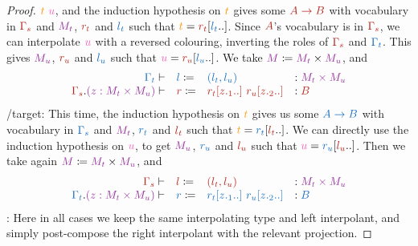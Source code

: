 \documentclass[a4paper,UKenglish,cleveref, autoref, thm-restate]{lipics-v2021}
\begin{document}
\begin{proof}
  \(\icol{t}~\ccol{u}\), and the induction hypothesis on \(\icol{t}\) gives
  some \(\scol{A \to B}\) with vocabulary in \(\scol{\Gamma_s}\) and
  \(\mcol{M_t}\), \(\scol{r_t}\) and \(\tcol{l_t}\) such that
  \(\icol{t} = \subs{\scol{r_t}}{\tcol{l_t}..}\). Since \(\scol{A}\)'s
  vocabulary is in \(\scol{\Gamma_s}\), we can
  interpolate \(\ccol{u}\) with a reversed colouring,
  \ie inverting the roles of \(\scol{\Gamma_s}\) and \(\tcol{\Gamma_t}\).
  This gives \(\mcol{M_u}\), \(\scol{r_u}\) and \(\tcol{l_u}\) such that
  \(\ccol{u} = \subs{\scol{r_u}}{\tcol{l_u}..}\). We take
  \(\mcol{M} \coloneq \mcol{M_t} \times \mcol{M_u}\), and
  \[\begin{array}{rlll}
      \tcol{\Gamma_{t}} \vdash & \tcol{l} \coloneq & \tcol{(l_t,l_u)} &
        \ty \mcol{M_t \times M_u} \\
      \scol{\Gamma_{s}}.\mcol{(z : M_t \times M_u)} \vdash & \scol{r} \coloneq &
        \scol{\subs{r_t}{\proj{1}{z}..}~\subs{r_u}{\proj{2}{z}..}} & \ty \scol{B}
  \end{array}\]
  /target: This time, the induction hypothesis on \(\icol{t}\) gives
  us some \(\tcol{A \to B}\) with vocabulary in \(\tcol{\Gamma_s}\) and
  \(\mcol{M_t}\), \(\tcol{r_t}\) and \(\scol{l_t}\) such that
  \(\icol{t} = \subs{\tcol{r_t}}{\scol{l_t}..}\). We can directly use the
  induction hypothesis on \(\ccol{u}\), to get
  \(\mcol{M_u}\), \(\tcol{r_u}\) and \(\scol{l_u}\) such that
  \(\ccol{u} = \subs{\tcol{r_u}}{\scol{l_u}..}\). Then we take again
  \(\mcol{M} \coloneq \mcol{M_t} \times \mcol{M_u}\), and
  \[\begin{array}{rlll}
      \scol{\Gamma_{s}} \vdash & \scol{l} \coloneq & \scol{(l_t,l_u)} &
        \ty \mcol{M_t \times M_u} \\
      \tcol{\Gamma_{t}}.\mcol{(z : M_t \times M_u)} \vdash & \tcol{r} \coloneq &
        \tcol{\subs{r_t}{\proj{1}{z}..}~\subs{r_u}{\proj{2}{z}..}} & \ty \tcol{B}
  \end{array}\]
  : Here in all cases we keep the same interpolating type
    and left interpolant, and simply post-compose the right interpolant with
    the relevant projection.
\end{proof}
\end{document}
